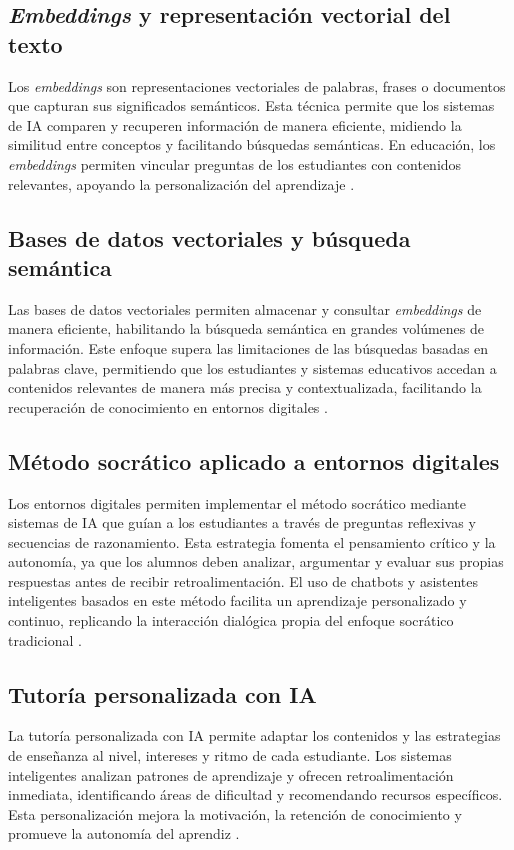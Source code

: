 \subsection{\textit{Embeddings} y representación vectorial del texto} Los \textit{embeddings} son
representaciones vectoriales de palabras, frases o documentos que capturan sus
significados semánticos. Esta técnica permite que los sistemas de IA comparen y
recuperen información de manera eficiente, midiendo la similitud entre
conceptos y facilitando búsquedas semánticas. En educación, los
\textit{embeddings} permiten vincular preguntas de los estudiantes con
contenidos relevantes, apoyando la personalización del aprendizaje
\cite{mikolov2013efficient, le2014distributed}.

\subsection{Bases de datos vectoriales y búsqueda semántica}
Las bases de datos vectoriales permiten almacenar y consultar
\textit{embeddings} de manera eficiente, habilitando la búsqueda semántica en
grandes volúmenes de información. Este enfoque supera las limitaciones de las
búsquedas basadas en palabras clave, permitiendo que los estudiantes y sistemas
educativos accedan a contenidos relevantes de manera más precisa y
contextualizada, facilitando la recuperación de conocimiento en entornos
digitales \cite{johnson2019billion, han2023comprehensive}.

\subsection{Método socrático aplicado a entornos digitales}
Los entornos digitales permiten implementar el método socrático mediante
sistemas de IA que guían a los estudiantes a través de preguntas reflexivas y
secuencias de razonamiento. Esta estrategia fomenta el pensamiento crítico y la
autonomía, ya que los alumnos deben analizar, argumentar y evaluar sus propias
respuestas antes de recibir retroalimentación. El uso de chatbots y asistentes
inteligentes basados en este método facilita un aprendizaje personalizado y
continuo, replicando la interacción dialógica propia del enfoque socrático
tradicional \cite{favero2024socratic, woolf2010building}.

\subsection{Tutoría personalizada con IA}
La tutoría personalizada con IA permite adaptar los contenidos y las
estrategias de enseñanza al nivel, intereses y ritmo de cada estudiante. Los
sistemas inteligentes analizan patrones de aprendizaje y ofrecen
retroalimentación inmediata, identificando áreas de dificultad y recomendando
recursos específicos. Esta personalización mejora la motivación, la retención
de conocimiento y promueve la autonomía del aprendiz \cite{woolf2010building,
    zawacki-richter2019systematic}.

